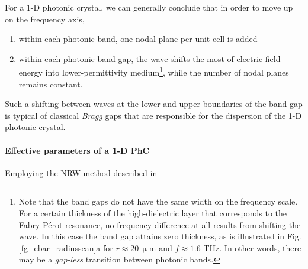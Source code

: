 




For a 1-D photonic crystal, we can generally conclude that in order to move up on the frequency axis,
\begin{enumerate}
 \item{within each photonic band, one nodal plane per unit cell is added
} 
 \item{within each photonic band gap, the wave shifts the most of electric field energy into lower-permittivity medium\footnote{Note that the band gaps do not have the same width on the frequency scale. For a certain thickness of the high-dielectric layer that corresponds to the Fabry-Pérot resonance, no frequency difference at all results from shifting the wave. In this case the band gap attains zero thickness, as is illustrated in Fig. \ref{fg_ebar_radiusscan}a for $r\approx20\,\upmu$m and $f\approx1.6$ THz. In other words, there may be a \textit{gap-less} transition between photonic bands.}, while the number of nodal planes remains constant. }
 \end{enumerate}

Such a shifting between waves at the lower and upper boundaries of the band gap is typical of classical \textit{Bragg} gaps that are responsible for the dispersion of the 1-D photonic crystal. 


\paragraph{Effective parameters of a 1-D PhC}
Employing the NRW method described in 



